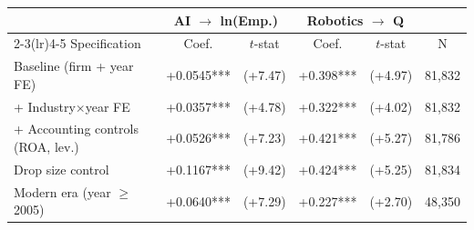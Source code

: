 \begin{tabular}{lccccc}
\toprule
& \multicolumn{2}{c}{AI $\to$ ln(Emp.)} & \multicolumn{2}{c}{Robotics $\to$ Q} & \\
\cmidrule(lr){2-3}\cmidrule(lr){4-5}
Specification & Coef. & $t$-stat & Coef. & $t$-stat & N \\
\midrule
Baseline (firm + year FE) & +0.0545*** & (+7.47) & +0.398*** & (+4.97) & 81,832 \\
+ Industry$\times$year FE & +0.0357*** & (+4.78) & +0.322*** & (+4.02) & 81,832 \\
+ Accounting controls (ROA, lev.) & +0.0526*** & (+7.23) & +0.421*** & (+5.27) & 81,786 \\
Drop size control & +0.1167*** & (+9.42) & +0.424*** & (+5.25) & 81,834 \\
Modern era (year $\geq$ 2005) & +0.0640*** & (+7.29) & +0.227*** & (+2.70) & 48,350 \\
\bottomrule
\end{tabular}